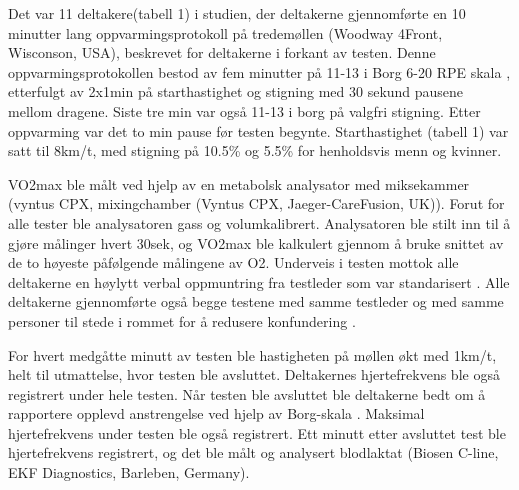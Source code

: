 \documentclass[
]{book}
\begin{document}
Det var 11 deltakere(tabell 1) i studien, der deltakerne gjennomførte en 10 minutter lang oppvarmingsprotokoll på tredemøllen (Woodway 4Front, Wisconson, USA), beskrevet for deltakerne i forkant av testen. Denne oppvarmingsprotokollen bestod av fem minutter på 11-13 i Borg 6-20 RPE skala \citep{borg1982}, etterfulgt av 2x1min på starthastighet og stigning med 30 sekund pausene mellom dragene. Siste tre min var også 11-13 i borg på valgfri stigning. Etter oppvarming var det to min pause før testen begynte. Starthastighet (tabell 1) var satt til 8km/t, med stigning på 10.5\% og 5.5\% for henholdsvis menn og kvinner.

VO2max ble målt ved hjelp av en metabolsk analysator med miksekammer (vyntus CPX, mixing­chamber (Vyntus CPX, Jaeger-CareFusion, UK)). Forut for alle tester ble analysatoren gass og volumkalibrert. Analysatoren ble stilt inn til å gjøre målinger hvert 30sek, og VO2max ble kalkulert gjennom å bruke snittet av de to høyeste påfølgende målingene av O2. Underveis i testen mottok alle deltakerne en høylytt verbal oppmuntring fra testleder som var standarisert \citep{halperin2015}. Alle deltakerne gjennomførte også begge testene med samme testleder og med samme personer til stede i rommet for å redusere konfundering \citep{halperin2015}.

For hvert medgåtte minutt av testen ble hastigheten på møllen økt med 1km/t, helt til utmattelse, hvor testen ble avsluttet. Deltakernes hjertefrekvens ble også registrert under hele testen. Når testen ble avsluttet ble deltakerne bedt om å rapportere opplevd anstrengelse ved hjelp av Borg-skala \citep{borg1982}. Maksimal hjertefrekvens under testen ble også registrert. Ett minutt etter avsluttet test ble hjertefrekvens registrert, og det ble målt og analysert blodlaktat (Biosen C-line, EKF Diagnostics, Barleben, Germany).

\providecommand{\docline}[3]{\noalign{\global\setlength{\arrayrulewidth}{#1}}\arrayrulecolor[HTML]{#2}\cline{#3}}

\setlength{\tabcolsep}{2pt}

\renewcommand*{\arraystretch}{1.5}
\end{document}
